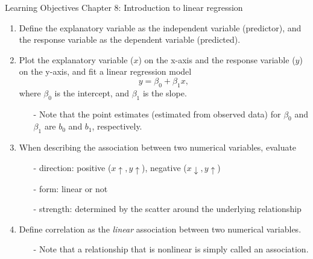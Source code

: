 \documentclass[11pt]{article}
\begin{document}
{\LARGE \textcolor{oiB}{Learning Objectives \hfill Chapter 8: Introduction to linear regression}} \\


%

\begin{enumerate}
\renewcommand\labelenumi{\textcolor{light}{\textbf{LO \theenumi.}}}

\item Define the explanatory variable as the independent variable (predictor), and the response variable as the dependent variable (predicted).

\item Plot the explanatory variable ($x$) on the x-axis and the response variable ($y$) on the y-axis, and fit a linear regression model
\[ y = \beta_0 + \beta_1 x,\]
where $\beta_0$ is the intercept, and $\beta_1$ is the slope.
\begin{itemize}
\item[-] Note that the point estimates (estimated from observed data) for $\beta_0$ and $\beta_1$ are $b_0$ and $b_1$, respectively.
\end{itemize}

\item When describing the association between two numerical variables, evaluate
\begin{itemize}
\item[-] direction: positive ($x \uparrow, y \uparrow$), negative ($x \downarrow, y \uparrow$)
\item[-] form: linear or not
\item[-] strength: determined by the scatter around the underlying relationship
\end{itemize}

\item Define correlation as the \emph{linear} association between two numerical variables.
\begin{itemize}
\item[-] Note that a relationship that is nonlinear is simply called an association.
\end{itemize}


\end{enumerate}
\end{document}
